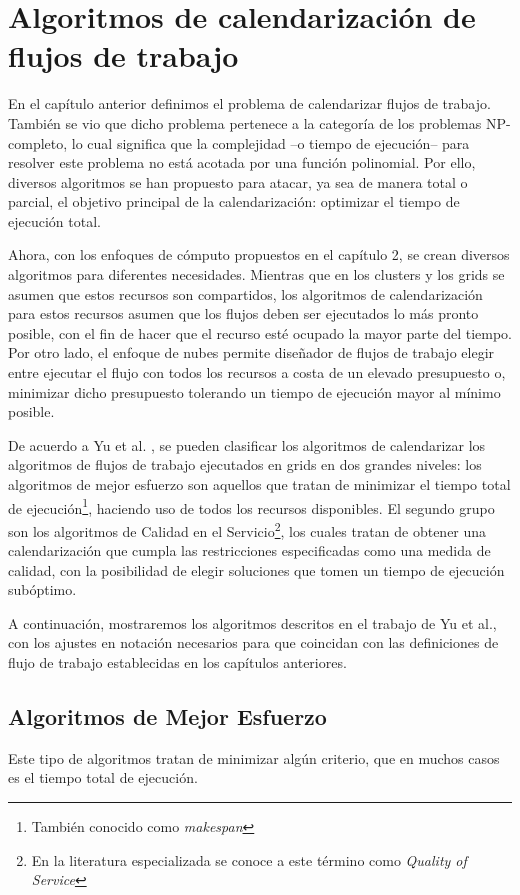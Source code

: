 \chapter{Algoritmos de calendarización de flujos de trabajo}
En el capítulo anterior definimos el problema de calendarizar flujos de trabajo. También se vio que dicho problema pertenece a la categoría de los problemas NP-completo, lo cual significa que la complejidad --o tiempo de ejecución-- para resolver este problema no está acotada por una función polinomial. Por ello, diversos algoritmos se han propuesto para atacar, ya sea de manera total o parcial, el objetivo principal de la calendarización: optimizar el tiempo de ejecución total.

Ahora, con los enfoques de cómputo propuestos en el capítulo 2, se crean diversos algoritmos para diferentes necesidades. Mientras que en los clusters y los grids se asumen que estos recursos son compartidos, los algoritmos de calendarización para estos recursos asumen que los flujos deben ser ejecutados lo más pronto posible, con el fin de hacer que el recurso esté ocupado la mayor parte del tiempo. Por otro lado, el enfoque de nubes permite diseñador de flujos de trabajo elegir entre ejecutar el flujo con todos los recursos a costa de un elevado presupuesto o, minimizar dicho presupuesto tolerando un tiempo de ejecución mayor al mínimo posible.

De acuerdo a Yu et al. \cite{yu2008workflow}, se pueden clasificar los algoritmos de calendarizar los algoritmos de flujos de trabajo ejecutados en grids en dos grandes niveles: los algoritmos de mejor esfuerzo son aquellos que tratan de minimizar el tiempo total de ejecución\footnote{También conocido como \emph{makespan}}, haciendo uso de todos los recursos disponibles. El segundo grupo son los algoritmos de Calidad en el Servicio\footnote{En la literatura especializada se conoce a este término como \emph{Quality of Service}}, los cuales tratan de obtener una calendarización que cumpla las restricciones especificadas como una medida de calidad, con la posibilidad de elegir soluciones que tomen un tiempo de ejecución subóptimo.

A continuación, mostraremos los algoritmos descritos en el trabajo de Yu et al., con los ajustes en notación necesarios para que coincidan con las definiciones de flujo de trabajo establecidas en los capítulos anteriores.


\section{Algoritmos de Mejor Esfuerzo}
Este tipo de algoritmos tratan de minimizar algún criterio, que en muchos casos es el tiempo total de ejecución.

